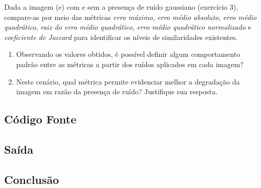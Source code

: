 \documentclass[10pt,a4paper]{article}
\begin{document}
Dada a imagem (e) com e sem a presença de ruído gaussiano (exercício 3), compare-as por meio das métricas  \textit{erro máximo}, \textit{erro médio absoluto}, \textit{erro médio quadrático}, \textit{raiz do erro médio quadrático}, \textit{erro médio quadrático normalizado} e \textit{coeficiente de Jaccard} para identificar os níveis de similaridades existentes.

\begin{enumerate}[label=\roman*.]
    \item Observando os valores obtidos, é possível definir algum comportamento padrão entre as métricas a partir dos ruídos aplicados em cada imagem?
    \item Neste cenário, qual métrica permite evidenciar melhor a degradação da imagem em razão da presença de ruído? Justifique sua resposta.
\end{enumerate}

\subsection{Código Fonte}



\subsection{Saída}



\subsection{Conclusão}
\end{document}
